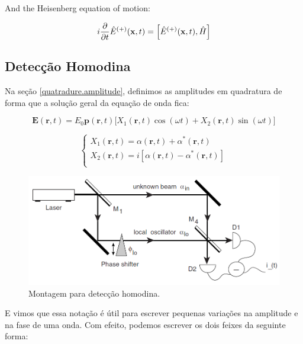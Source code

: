 \documentclass[12pt,a4paper]{report}
\begin{document}
And the Heisenberg equation of motion:

\begin{equation}
    i\frac{\partial}{\partial t}\hat E^{(+)}(\textbf{x},t)=\comm{\hat E^{(+)}(\textbf{x},t)}{\hat H}
\end{equation}


\subsection{Detecção Homodina}

Na seção \ref{quatradure.amplitude}, definimos as amplitudes em quadratura de forma que a solução geral da equação de onda fica:

\begin{equation}
    \textbf{E}(\textbf{r},t)=E_0\textbf{p}(\textbf{r},t)\bigl[X_1(\textbf{r},t)\cos(\omega t)+X_2(\textbf{r},t)\sin(\omega t)\bigr]
\end{equation}

\begin{equation}
    \begin{cases}
        X_1(\textbf{r},t)=\alpha(\textbf{r},t)+\alpha^*(\textbf{r},t)\\
        X_2(\textbf{r},t)=i[\alpha(\textbf{r},t)-\alpha^*(\textbf{r},t)]\\
    \end{cases}
\end{equation}

\begin{figure}[H]
    \centering
    \includegraphics[width=1.0\linewidth]{homodyne detection.png}
    \caption{Montagem para detecção homodina.}
    \label{homodyne.detection}
\end{figure}

E vimos que essa notação é útil para escrever pequenas variações na amplitude e na fase de uma onda. Com efeito, podemos escrever os dois feixes da seguinte forma:
\end{document}
